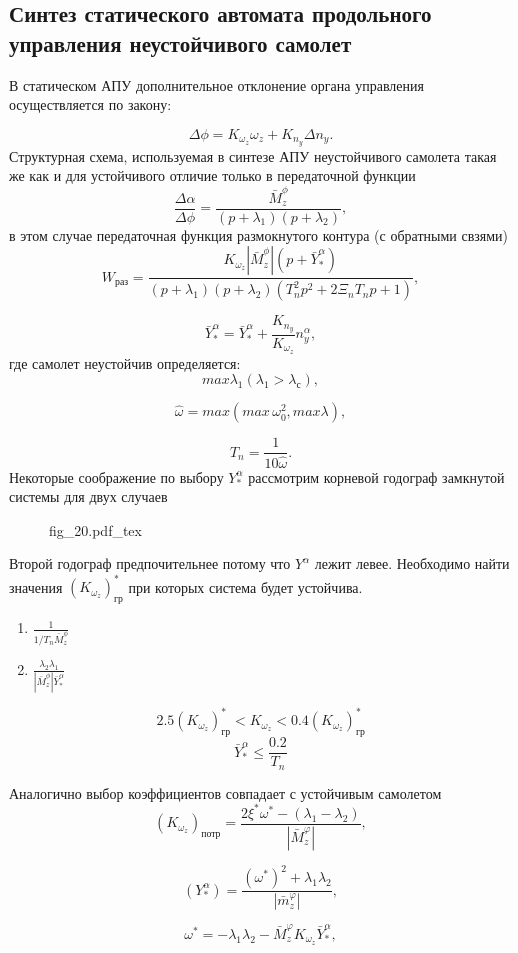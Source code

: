 \documentclass{article}
\begin{document}
\subsection{Синтез статического автомата продольного управления неустойчивого самолет}
В статическом АПУ дополнительное отклонение органа управления осуществляется по закону: 

\[
	\Delta \phi = K_{\omega_{z}} \omega_z + K_{n_y} \Delta n_y.
\]
Структурная схема, используемая в синтезе АПУ неустойчивого самолета такая же как и для устойчивого отличие только в передаточной функции 
\[
	{\frac{\Delta \alpha}{\Delta \phi} } = \frac{\bar{M}_z^\phi}{(p+\lambda_1)(p+\lambda_2)},
\]
в этом случае передаточная функция размокнутого контура (с обратными свзями)
\[
	W_\text{раз} = \frac{K_{\omega_z} |\bar{M}_z^\phi |(p + \bar{Y}^\alpha_*) }{(p+\lambda_1)(p+\lambda_2)(T_n^2 p^2 + 2 \Xi_n T_n p +1)},
\]

\[
	\bar{Y}_*^\alpha = \bar{Y}_*^\alpha + \frac{K_{n_y}}{K_{\omega_z}} n_y^\alpha,
\]
где самолет неустойчив определяется: 
\[
	max \lambda_1 (\lambda_1 > \lambda_\text{с}),
\]

\[
	\hat{\omega} = max(max \, \omega_0^2, max \lambda),
\]

\[
	T_n = \frac{1}{10 \hat{\omega}}.
\]
Некоторые соображение по выбору $Y_*^\alpha$ рассмотрим корневой годограф замкнутой системы для двух случаев 
\begin{figure}[ht]
	\centering
	{fig_20.pdf_tex}
\end{figure}

Второй годограф предпочительнее потому что $Y^\alpha$ лежит левее.
Необходимо найти значения $(K_{\omega_z})_\text{гр}^*$ при которых система будет устойчива.
\begin{enumerate}
	\item $\frac{1}{1/T_n \bar{M}_z^\phi}$
	\item $\frac{\lambda_2 \lambda_1}{| \bar{M}_z^\phi|\bar{Y}_*^\alpha}$
\end{enumerate}
\[
	2.5 (K_{\omega_z})^*_\text{гр} < K_{\omega_z} < 0.4(K_{\omega_z})^*_\text{гр}
\]
\[
	\bar{Y}_*^\alpha \le \frac{0.2}{T_n}
\]

Аналогично выбор коэффициентов совпадает с устойчивым самолетом 
\[
	(K_{\omega_z})_\text{потр} = \frac{2 \xi^* \omega^* - (\lambda_1 - \lambda_2)}{|\bar{M}_z^\varphi|},
\]

\[
	(Y_*^\alpha) = \frac{(\omega^*)^2 + \lambda_1 \lambda_2}{|\bar{m}_z^\varphi|},
\]

\[
	\omega^* =  - \lambda_1 \lambda_2 - \bar{M}_z^\varphi K_{\omega_z} \bar{Y}_*^\alpha, 
\]
\end{document}
